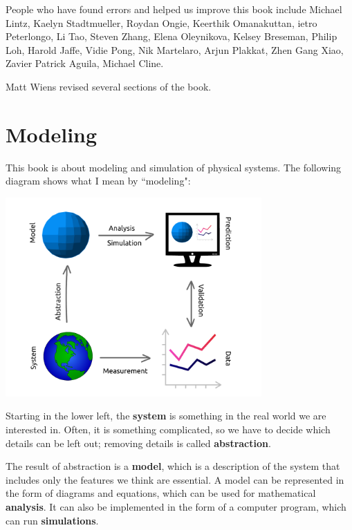 \documentclass[
]{book}
\numberwithin{Answer}{chapter}
\numberwithin{Exercise}{chapter}
\begin{document}
People who have found errors and helped us improve this book include
Michael Lintz, 
Kaelyn Stadtmueller, 
Roydan Ongie, 
Keerthik Omanakuttan, 
ietro Peterlongo, 
Li Tao, 
Steven Zhang, 
Elena Oleynikova, 
Kelsey Breseman, 
Philip Loh, 
Harold Jaffe, 
Vidie Pong, 
Nik Martelaro, 
Arjun Plakkat, 
Zhen Gang Xiao, 
Zavier Patrick Aguila, 
Michael Cline.

Matt Wiens revised several sections of the book.

\newpage


\tableofcontents

\mainmatter

\chapter{Modeling}

This book is about modeling and simulation of physical systems.  
The following diagram shows what I mean by ``modeling":


\vspace{0.2in}
\centerline{\includegraphics[height=3in]{figs/modeling_framework.pdf}}

Starting in the lower left, the {\bf system} is something in the real world we are interested in.  Often, it is something complicated, so we have to decide which details can be left out; removing details is called {\bf abstraction}.


The result of abstraction is a {\bf model}, which is a description of the system that includes only the features we think are essential.  A model can be represented in the form of diagrams and equations, which can be used for mathematical {\bf analysis}.  It can also be implemented in the form of a computer program, which can run {\bf simulations}.
\end{document}
